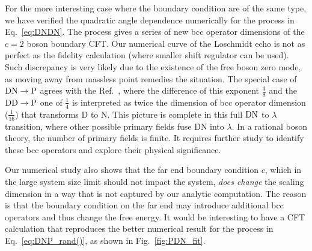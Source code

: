 For the more interesting case where the boundary condition are of the same type, we have verified the quadratic angle dependence numerically for {\color{red}the process in Eq.~\eqref{eq:DNDN}.}
The process gives a series of new bcc operator dimensions of the $c = 2$ boson boundary CFT. Our numerical curve of the Loschmidt echo is not as perfect as the fidelity calculation (where smaller shift regulator can be used). Such discrepancy is very likely due to the existence of the free boson zero mode, as moving away from massless point remedies the situation. The special case of ${\rm DN} \rightarrow {\rm P}$ agrees with the Ref.~, where the difference of this exponent $\frac{3}{8}$ and the ${\rm DD} \rightarrow {\rm P}$ one of $\frac{1}{4}$ is interpreted as twice the dimension of bcc operator dimension ($\frac{1}{16}$) that transforms D to N. This picture is complete in this full ${\rm DN}$ to $\lambda $ transition, where other possible primary fields fuse DN into $\lambda$. In a rational boson theory, the number of primary fields is finite. It requires further study to identify these bcc operators and explore their physical significance. 


Our numerical study also shows that the far end boundary condition $c$, which in the large system size limit should not impact the system, {\it does change} the scaling dimension in a way that is not captured by our analytic computation. The reason is that the boundary condition on the far end may introduce additional bcc operators and thus change the free energy. It would be interesting to have a CFT calculation that reproduces the better numerical result {\color{red}for the process in Eq.~\eqref{eq:DNP_rand()}, as}
shown in Fig.~\ref{fig:PDN_fit}.


